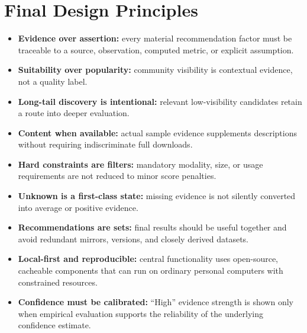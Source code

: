 \documentclass[11pt]{article}
\begin{document}
\section{Final Design Principles}
\begin{itemize}[leftmargin=*]
\item \textbf{Evidence over assertion:} every material recommendation factor must be traceable to a source,
      observation, computed metric, or explicit assumption.
\item \textbf{Suitability over popularity:} community visibility is contextual evidence, not a quality
      label.
\item \textbf{Long-tail discovery is intentional:} relevant low-visibility candidates retain a route into
      deeper evaluation.
\item \textbf{Content when available:} actual sample evidence supplements descriptions without requiring
      indiscriminate full downloads.
\item \textbf{Hard constraints are filters:} mandatory modality, size, or usage requirements are not
      reduced to minor score penalties.
\item \textbf{Unknown is a first-class state:} missing evidence is not silently converted into average or
      positive evidence.
\item \textbf{Recommendations are sets:} final results should be useful together and avoid redundant
      mirrors, versions, and closely derived datasets.
\item \textbf{Local-first and reproducible:} central functionality uses open-source, cacheable components
      that can run on ordinary personal computers with constrained resources.
\item \textbf{Confidence must be calibrated:} ``High'' evidence strength is shown only when empirical
      evaluation supports the reliability of the underlying confidence estimate.
\end{itemize}

\end{document}
